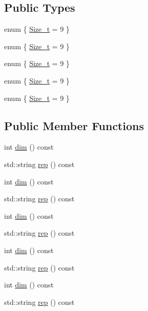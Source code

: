 \subsection*{Public Types}
\begin{DoxyCompactItemize}
\item 
enum \{ \mbox{\hyperlink{structHadron_1_1J4Rep_a778caf0141a1dc6e96fe57273594d4d7a35f16a8e2fdabda918054d6b9eeedac6}{Size\+\_\+t}} = 9
 \}
\item 
enum \{ \mbox{\hyperlink{structHadron_1_1J4Rep_a778caf0141a1dc6e96fe57273594d4d7a35f16a8e2fdabda918054d6b9eeedac6}{Size\+\_\+t}} = 9
 \}
\item 
enum \{ \mbox{\hyperlink{structHadron_1_1J4Rep_a778caf0141a1dc6e96fe57273594d4d7a35f16a8e2fdabda918054d6b9eeedac6}{Size\+\_\+t}} = 9
 \}
\item 
enum \{ \mbox{\hyperlink{structHadron_1_1J4Rep_a778caf0141a1dc6e96fe57273594d4d7a35f16a8e2fdabda918054d6b9eeedac6}{Size\+\_\+t}} = 9
 \}
\item 
enum \{ \mbox{\hyperlink{structHadron_1_1J4Rep_a778caf0141a1dc6e96fe57273594d4d7a35f16a8e2fdabda918054d6b9eeedac6}{Size\+\_\+t}} = 9
 \}
\end{DoxyCompactItemize}
\subsection*{Public Member Functions}
\begin{DoxyCompactItemize}
\item 
int \mbox{\hyperlink{structHadron_1_1J4Rep_abd7390e1c86d4543ad991a7167f46615}{dim}} () const
\item 
std\+::string \mbox{\hyperlink{structHadron_1_1J4Rep_a2dcdb2a04a0f8207e99fffb770037b9e}{rep}} () const
\item 
int \mbox{\hyperlink{structHadron_1_1J4Rep_abd7390e1c86d4543ad991a7167f46615}{dim}} () const
\item 
std\+::string \mbox{\hyperlink{structHadron_1_1J4Rep_a2dcdb2a04a0f8207e99fffb770037b9e}{rep}} () const
\item 
int \mbox{\hyperlink{structHadron_1_1J4Rep_abd7390e1c86d4543ad991a7167f46615}{dim}} () const
\item 
std\+::string \mbox{\hyperlink{structHadron_1_1J4Rep_a2dcdb2a04a0f8207e99fffb770037b9e}{rep}} () const
\item 
int \mbox{\hyperlink{structHadron_1_1J4Rep_abd7390e1c86d4543ad991a7167f46615}{dim}} () const
\item 
std\+::string \mbox{\hyperlink{structHadron_1_1J4Rep_a2dcdb2a04a0f8207e99fffb770037b9e}{rep}} () const
\item 
int \mbox{\hyperlink{structHadron_1_1J4Rep_abd7390e1c86d4543ad991a7167f46615}{dim}} () const
\item 
std\+::string \mbox{\hyperlink{structHadron_1_1J4Rep_a2dcdb2a04a0f8207e99fffb770037b9e}{rep}} () const
\end{DoxyCompactItemize}


